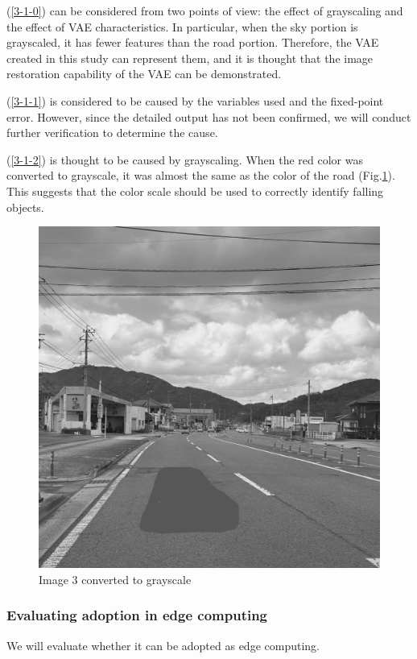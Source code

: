 \documentclass[conference]{IEEEtran}
\begin{document}
(\ref{3-1-0}) can be considered from two points of view: the effect of grayscaling and the effect of VAE characteristics.
In particular, when the sky portion is grayscaled, it has fewer features than the road portion.
Therefore, the VAE created in this study can represent them, and it is thought that the image restoration capability of the VAE can be demonstrated.

(\ref{3-1-1}) is considered to be caused by the variables used and the fixed-point error.
However, since the detailed output has not been confirmed, we will conduct further verification to determine the cause.

(\ref{3-1-2}) is thought to be caused by grayscaling.
When the red color was converted to grayscale, it was almost the same as the color of the road (Fig.\ref{fig:3-3-5}).
This suggests that the color scale should be used to correctly identify falling objects.

\begin{figure}
  \begin{center}
    \includegraphics[width=0.45\columnwidth]{figures/De_re1.png}
  \end{center}
  \caption{Image 3 converted to grayscale}
  \label{fig:3-3-5}
\end{figure}

\subsubsection{Evaluating adoption in edge computing}
We will evaluate whether it can be adopted as edge computing.
\end{document}
